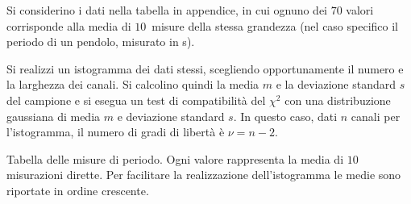 \documentclass{lab1-article}
\begin{document}
\begin{article}
Si considerino i dati nella tabella in appendice, in cui ognuno dei $70$ valori
corrisponde alla media di $10$~misure della stessa grandezza (nel caso
specifico il periodo di un pendolo, misurato in s).

Si realizzi un istogramma dei dati stessi, scegliendo opportunamente il numero
e la larghezza dei canali. Si calcolino quindi la media $m$ e la deviazione
standard $s$ del campione e si esegua un test di compatibilit\`a del $\chi^2$
con una distribuzione gaussiana di media $m$ e deviazione standard $s$.
In questo caso, dati $n$ canali per l'istogramma, il numero di gradi di
libert\`a \`e $\nu = n - 2$.


\begin{table*}
  \renewcommand\arraystretch{1.25}
  \begin{center}
    
  \end{center}
  \caption{Tabella delle misure di periodo. Ogni valore rappresenta la media
  di $10$ misurazioni dirette. Per facilitare la realizzazione dell'istogramma
  le medie sono riportate in ordine crescente.}
\end{table*}


\end{article}
\end{document}
